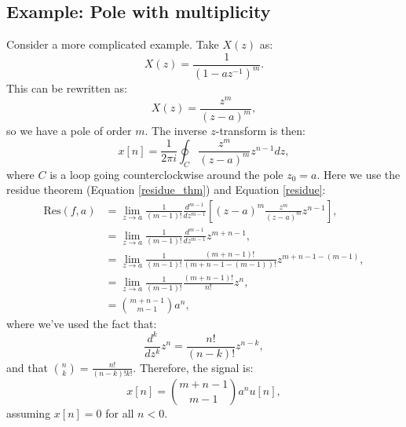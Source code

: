 \subsection{Example: Pole with multiplicity}
Consider a more complicated example. Take $X(z)$ as:
$$X(z)=\frac{1}{(1-az^{-1})^{m}}.$$
This can be rewritten as:
\begin{equation}
    X(z) = \frac{z^{m}}{(z-a)^{m}},
\end{equation}
so we have a pole of order $m$. The inverse $z$-transform is then:
\begin{equation}
    x[n] = \frac{1}{2\pi i}\oint_{C}\frac{z^{m}}{(z-a)^{m}}z^{n-1}dz,
\end{equation}
where $C$ is a loop going counterclockwise around the pole $z_{0}=a$. 
Here we use the residue theorem (Equation \ref{residue_thm}) and Equation \ref{residue}:
\begin{align}
    \text{Res}(f,a) &= \lim_{z\to a}\frac{1}{(m-1)!}\frac{d^{m-1}}{dz^{m-1}}\left[(z-a)^{m}\frac{z^{m}}{(z-a)^{m}}z^{n-1}\right], \\
    &= \lim_{z\to a}\frac{1}{(m-1)!}\frac{d^{m-1}}{dz^{m-1}}z^{m+n-1}, \\
    &= \lim_{z\to a}\frac{1}{(m-1)!}\frac{(m+n-1)!}{(m+n-1-(m-1))!}z^{m+n-1-(m-1)}, \\
    &= \lim_{z\to a}\frac{1}{(m-1)!}\frac{(m+n-1)!}{n!}z^{n}, \\
    &= \binom{m+n-1}{m-1}a^{n},
\end{align}
where we've used the fact that: 
\begin{equation}
    \frac{d^{k}}{dz^{k}}z^{n} = \frac{n!}{(n-k)!} z^{n-k},
\end{equation}
and that $\binom{n}{k}=\frac{n!}{(n-k)!k!}$. Therefore, the signal is:
\begin{equation}
    x[n] = \binom{m+n-1}{m-1}a^{n}u[n],
\end{equation}
assuming $x[n]=0$ for all $n<0$. 




